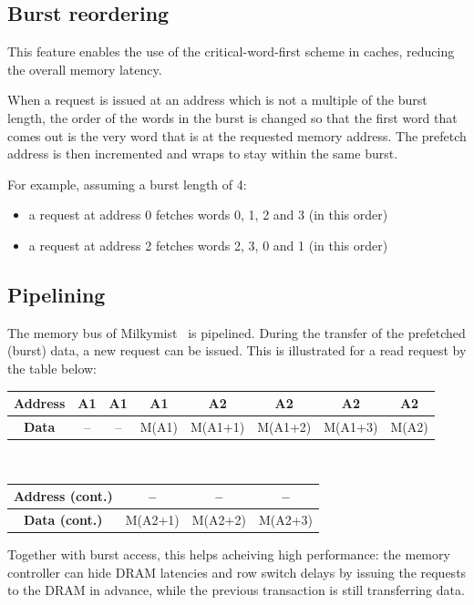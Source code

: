 \documentclass[a4paper,11pt]{kthesis}
\begin{document}
\subsection{Burst reordering}
\label{subsec:fmlborder}
This feature enables the use of the critical-word-first scheme in caches, reducing the overall memory latency.

When a request is issued at an address which is not a multiple of the burst length, the order of the words in the burst is changed so that the first word that comes out is the very word that is at the requested memory address. The prefetch address is then incremented and wraps to stay within the same burst.

For example, assuming a burst length of 4:
\begin{itemize}
\item a request at address 0 fetches words 0, 1, 2 and 3 (in this order)
\item a request at address 2 fetches words 2, 3, 0 and 1 (in this order)
\end{itemize}

\subsection{Pipelining}
\label{subsec:fmlpipe}
The memory bus of Milkymist~\cite{fml} is pipelined. During the transfer of the prefetched (burst) data, a new request can be issued. This is illustrated for a read request by the table below:

\begin{tabular}{|c|c|c|c|c|c|c|c|}
\hline
\textbf{Address} & A1 & A1 & A1 & A2 & A2 & A2 & A2 \\
\hline
\textbf{Data} & -- & -- & M(A1) & M(A1+1) & M(A1+2) & M(A1+3) & M(A2) \\
\hline
\end{tabular}\\

\begin{tabular}{|c|c|c|c|}
\hline
\textbf{Address (cont.)} & -- & -- & --\\
\hline
\textbf{Data (cont.)} & M(A2+1) & M(A2+2) & M(A2+3) \\
\hline
\end{tabular}

Together with burst access, this helps acheiving high performance: the memory controller can hide DRAM latencies and row switch delays by issuing the requests to the DRAM in advance, while the previous transaction is still transferring data.
\end{document}
